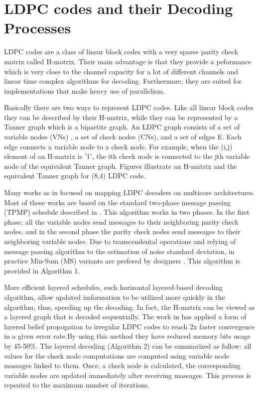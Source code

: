 \documentclass[conference]{IEEEtran}
\begin{document}
\section{LDPC codes and their Decoding Processes}\label{sec2}

LDPC codes are a class of linear block codes with a very sparse parity check matrix called H-matrix. Their main advantage is that they provide a peformance which is very close to the channel capacity for a lot of different channels and linear time complex algorithms for decoding. Furthermore, they are suited for implementations that make heavy use of parallelism.

Basically there are two ways to represent LDPC codes. Like all linear block codes they can be described by their H-matrix, while they can be represented by a Tanner graph which is a bipartite graph. An LDPC graph consists of a set of variable nodes (VNs) , a set of check nodes (CNs), and a set of edges E. Each edge connects a variable node to a check node. For example, when the (i,j) element of an H-matrix is '1', the ith check node is connected to the jth variable node of the equivalent Tanner graph. Figures illustrate an H-matrix and the equivalent Tanner graph for (8,4) LDPC code.

Many works as in \cite{art_massively, art_ldpc_cpu0,art_ldpc_OpenCl_1,art_gpu_0} focused on mapping LDPC decoders on multicore architectures. Most of these works are based on the standard two-phase message passing (TPMP) schedule described in \cite{art_massively}. This algorithm works in two phases. In the first phase, all the variable nodes send messages to their neighboring parity check nodes, and in the second phase the parity check nodes send messages to their neighboring variable nodes. Due to transcendental operations and relying of message passing algorithm to the estimation of noise standard deviation, in practice Min-Sum (MS) variants are prefered by designers \cite{art_neon}. This algorithm is provided in Algorithm 1.

More efficient layered schedules, such horizontal layered-based decoding algorithm, allow updated imformation to be utilized more quickly in the algorithm, thus, speeding up the decoding\cite{art_layered0, art_layered1}. In fact, the H-matrix can be viewed as a layered graph that is decoded sequentially. The work in \cite{art_gpu_0} has applied a form of layered belief propogation to irregular LDPC codes to reach 2x faster convergence in a given error rate.By using this method they have reduced memory bits usage by 45-50\%. The layered decoding (Algorithm 2) can be summarized as follow: all values for the check node computations are computed using variable node massages linked to them. Once, a check node is calculated, the corresponding variable nodes are updated immediately after receiving massages. This process is repeated to the maximum number of iterations.
\end{document}
